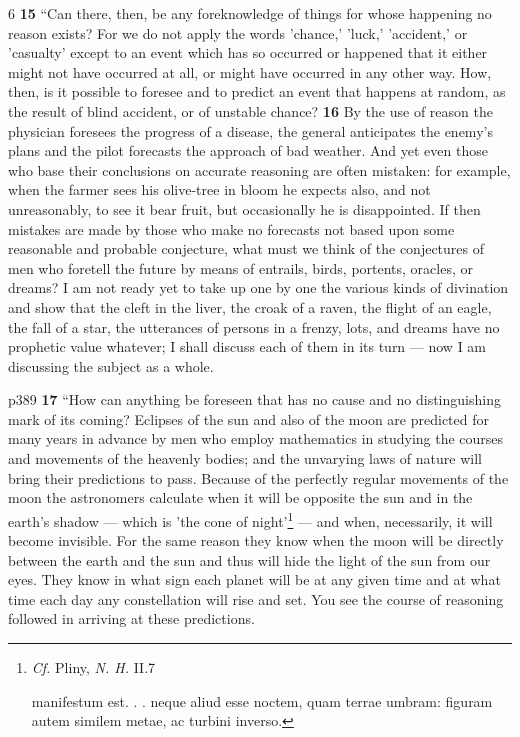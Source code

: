 6
\textbf{15} ``Can there, then, be any foreknowledge of things for whose happening no reason exists? For we do not apply the words 'chance,' 'luck,' 'accident,' or 'casualty' except to an event which has so occurred or happened that it either might not have occurred at all, or might have occurred in any other way. How, then, is it possible to foresee and to predict an event that happens at random, as the result of blind accident, or of unstable chance? \textbf{16} By the use of reason the physician foresees the progress of a disease, the general anticipates the enemy's plans and the pilot forecasts the approach of bad weather. And yet even those who base their conclusions on accurate reasoning are often mistaken: for example, when the farmer sees his olive-tree in bloom he expects also, and not unreasonably, to see it bear fruit, but occasionally he is disappointed. If then mistakes are made by those who make no forecasts not based upon some reasonable and probable conjecture, what must we think of the conjectures of men who foretell the future by means of entrails, birds, portents, oracles, or dreams? I am not ready yet to take up one by one the various kinds of divination and show that the cleft in the liver, the croak of a raven, the flight of an eagle, the fall of a star, the utterances of persons in a frenzy, lots, and dreams have no prophetic value whatever; I shall discuss each of them in its turn \texthebrew{—} now I am discussing the subject as a whole.

p389
\textbf{17} ``How can anything be foreseen that has no cause and no distinguishing mark of its coming? Eclipses of the sun and also of the moon are predicted for many years in advance by men who employ mathematics in studying the courses and movements of the heavenly bodies; and the unvarying laws of nature will bring their predictions to pass. Because of the perfectly regular movements of the moon the astronomers calculate when it will be opposite the sun and in the earth's shadow \texthebrew{—} which is 'the cone of night'\texthebrew{}\footnote{\emph{Cf.} Pliny, \emph{N. H.} II.7

manifestum est. . . neque aliud esse noctem, quam terrae umbram: figuram autem similem metae, ac turbini inverso.

} \texthebrew{—} and when, necessarily, it will become invisible. For the same reason they know when the moon will be directly between the earth and the sun and thus will hide the light of the sun from our eyes. They know in what sign each planet will be at any given time and at what time each day any constellation will rise and set. You see the course of reasoning followed in arriving at these predictions.

